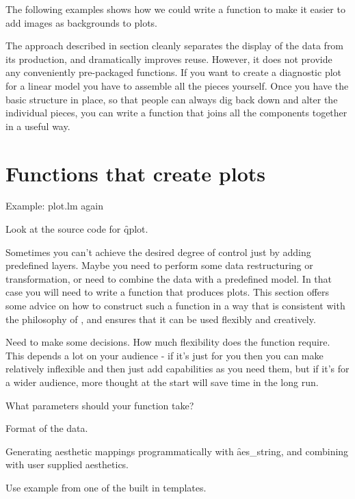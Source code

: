 The following examples shows how we could write a  function to make it easier to add images as backgrounds to plots.

% 
% 


The approach described in section cleanly separates the display of the data from its production, and dramatically improves reuse.  However, it does not provide any conveniently pre-packaged functions.  If you want to create a diagnostic plot for a linear model you have to assemble all the pieces yourself.  Once you have the basic structure in place, so that people can always dig back down and alter the individual pieces, you can write a function that joins all the components together in a useful way.

\section{Functions that create plots}
\label{sec:functions}

Example: plot.lm again

Look at the source code for \f{qplot}.

Sometimes you can't achieve the desired degree of control just by adding predefined layers.  Maybe you need to perform some data restructuring or transformation, or need to combine the data with a predefined model.  In that case you will need to write a function that produces \ggplot plots.  This section offers some advice on how to construct such a function in a way that is consistent with the philosophy of \ggplot, and ensures that it can be used flexibly and creatively.

Need to make some decisions.  How much flexibility does the function require.  This depends a lot on your audience - if it's just for you then you can make relatively inflexible and then just add capabilities as you need them, but if it's for a wider audience, more thought at the start will save time in the long run.

What parameters should your function take?

Format of the data.

Generating aesthetic mappings programmatically with \f{aes_string}, and combining with user supplied aesthetics.

Use example from one of the built in templates.  



